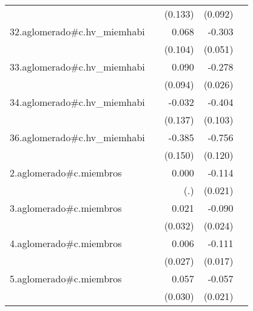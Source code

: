 {\begin{longtable}{l*{4}{D{.}{.}{-1}}}
            &                     &     (0.133)         &     (0.092)         &                     \\
\addlinespace
32.aglomerado#c.hv\_miemhabi&                     &       0.068         &      -0.303\sym{***}&                     \\
            &                     &     (0.104)         &     (0.051)         &                     \\
\addlinespace
33.aglomerado#c.hv\_miemhabi&                     &       0.090         &      -0.278\sym{***}&                     \\
            &                     &     (0.094)         &     (0.026)         &                     \\
\addlinespace
34.aglomerado#c.hv\_miemhabi&                     &      -0.032         &      -0.404\sym{***}&                     \\
            &                     &     (0.137)         &     (0.103)         &                     \\
\addlinespace
36.aglomerado#c.hv\_miemhabi&                     &      -0.385\sym{*}  &      -0.756\sym{***}&                     \\
            &                     &     (0.150)         &     (0.120)         &                     \\
\addlinespace
2.aglomerado#c.miembros&                     &       0.000         &      -0.114\sym{***}&                     \\
            &                     &         (.)         &     (0.021)         &                     \\
\addlinespace
3.aglomerado#c.miembros&                     &       0.021         &      -0.090\sym{***}&                     \\
            &                     &     (0.032)         &     (0.024)         &                     \\
\addlinespace
4.aglomerado#c.miembros&                     &       0.006         &      -0.111\sym{***}&                     \\
            &                     &     (0.027)         &     (0.017)         &                     \\
\addlinespace
5.aglomerado#c.miembros&                     &       0.057         &      -0.057\sym{**} &                     \\
            &                     &     (0.030)         &     (0.021)         &                     \\

\end{longtable}}
